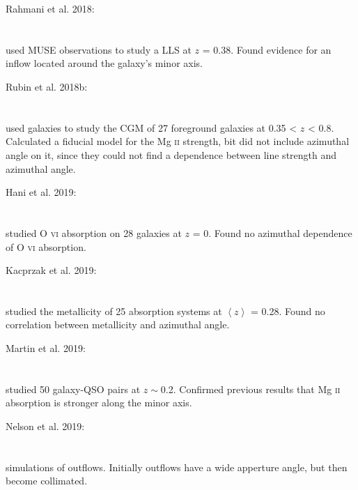 \hline

Rahmani et al. 2018: \\
\citet{2018MNRAS.474..254R} \\
\citep{2018MNRAS.474..254R} \\
used MUSE observations to study a LLS at $z$ = 0.38. Found evidence for an
inflow located around the galaxy's minor axis. \\

\hline

Rubin et al. 2018b: \\
\citet{2018ApJ...868..142R} \\
\citep{2018ApJ...868..142R} \\
used galaxies to study the CGM of 27 foreground galaxies at 0.35 < $z$ < 0.8.
Calculated a fiducial model for the Mg \textsc{ii} strength, bit did not include
azimuthal angle on it, since they could not find a dependence between line
strength and azimuthal angle. \\

\hline

Hani et al. 2019: \\
\citet{2019MNRAS.488..135H} \\
\citep{2019MNRAS.488..135H} \\
studied O \textsc{vi} absorption on 28 galaxies at $z$ = 0. Found no azimuthal
dependence of O \textsc{vi} absorption.\\

\hline

Kacprzak et al. 2019: \\
\citet{2019ApJ...886...91K} \\
\citep{2019ApJ...886...91K} \\
studied the metallicity of 25 absorption systems at $\left< z\right>$ = 0.28.
Found no correlation between metallicity and azimuthal angle. \\

\hline

Martin et al. 2019: \\
\citet{2019ApJ...878...84M} \\
\citep{2019ApJ...878...84M} \\
studied 50 galaxy-QSO pairs at $z\sim$0.2. Confirmed previous results that
Mg \textsc{ii} absorption is stronger along the minor axis. \\

\hline

Nelson et al. 2019: \\
\citet{2019MNRAS.490.3234N} \\
\citep{2019MNRAS.490.3234N} \\
simulations of outflows. Initially outflows have a wide apperture angle, but
then become collimated. \\

